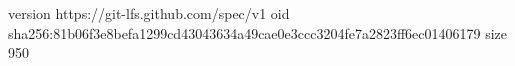 version https://git-lfs.github.com/spec/v1
oid sha256:81b06f3e8befa1299cd43043634a49cae0e3ccc3204fe7a2823ff6ec01406179
size 950
